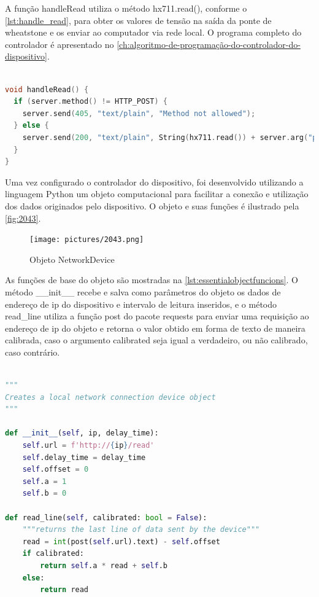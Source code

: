 A função handleRead utiliza o método hx711.read(), conforme o \autoref{lst:handle_read}, para obter os valores de tensão na saída da ponte de wheatstone e os
enviar ao computador via rede local.
O programa completo do controlador é apresentado no \autoref{ch:algoritmo-de-programação-do-controlador-do-dispositivo}.

\begin{lstlisting}[label={lst:handle_read},language=C++,caption={[Controller Program]{Função de obtenção de sinal pelo amplificador HX711}}]

void handleRead() {
  if (server.method() != HTTP_POST) {
    server.send(405, "text/plain", "Method not allowed");
  } else {
    server.send(200, "text/plain", String(hx711.read()) + server.arg("plain"));
  }
}

\end{lstlisting}

Uma vez configurado o controlador do dispositivo, foi desenvolvido utilizando a linguagem Python um objeto computacional para facilitar a conexão e utilização dos dados originados pelo dispositivo.
O objeto e suas funções é ilustrado pela \autoref{fig:2043}.

\begin{figure}[htb]
	\caption{\label{fig:2043} Objeto NetworkDevice}
	\begin{center}
		\texttt{[image: pictures/2043.png]}
	\end{center}
\end{figure}

As funções de base do objeto são mostradas na \autoref{lst:essentialobjectfuncions}.
O método \_\_init\_\_ recebe e salva como parâmetros do objeto os dados de endereço de ip do dispositivo e intervalo de leitura inseridos,
e o método read\_line utiliza a função post do pacote requests para enviar uma requisição ao endereço de ip do objeto e retorna o valor obtido em forma de
texto de maneira calibrada, caso o argumento calibrated seja igual a verdadeiro, ou não calibrado, caso contrário.

\begin{lstlisting}[label={lst:essentialobjectfuncions},language=Python,caption={[NetworkDevice]{Métodos base do objeto NetworkDevice}}]

"""
Creates a local network connection device object
"""

def __init__(self, ip, delay_time):
	self.url = f'http://{ip}/read'
	self.delay_time = delay_time
	self.offset = 0
	self.a = 1
	self.b = 0

def read_line(self, calibrated: bool = False):
	"""returns the last line of data sent by the device"""
	read = int(post(self.url).text) - self.offset
	if calibrated:
		return self.a * read + self.b
	else:
		return read

\end{lstlisting}

